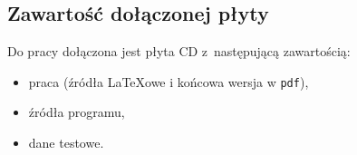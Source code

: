 \documentclass[a4paper,twoside,12pt]{book}
\begin{document}
\begin{appendices}



\chapter*{Zawartość dołączonej płyty}

Do pracy dołączona jest płyta CD z~następującą zawartością:
\begin{itemize}
\item praca (źródła \LaTeX owe i końcowa wersja w \texttt{pdf}),
\item źródła programu,
\item dane testowe.
\end{itemize}

\listoffigures
\listoftables
	
\end{appendices}
\end{document}
